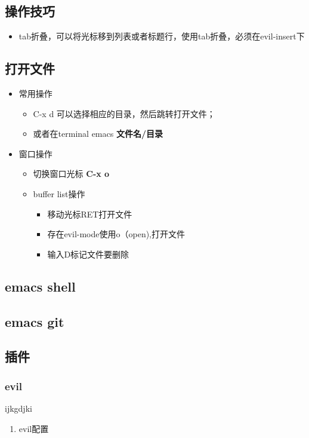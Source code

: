 \documentclass[11pt]{article}
\begin{document}
\subsection{操作技巧}
\label{sec:orgfbd032c}

\begin{itemize}
\item tab折叠，可以将光标移到列表或者标题行，使用tab折叠，必须在evil-insert下
\end{itemize}

\subsection{打开文件}
\label{sec:org768a3b0}
\begin{itemize}
\item 常用操作
\begin{itemize}
\item C-x d 可以选择相应的目录，然后跳转打开文件；
\item 或者在terminal emacs \textbf{\textbf{文件名/目录}}
\end{itemize}
\end{itemize}


\begin{itemize}
\item 窗口操作
\begin{itemize}
\item 切换窗口光标 \textbf{\textbf{C-x o}}
\item buffer list操作
\begin{itemize}
\item 移动光标RET打开文件
\item 存在evil-mode使用o（open),打开文件
\item 输入D标记文件要删除
\end{itemize}
\end{itemize}
\end{itemize}


\subsection{emacs shell}
\label{sec:orgcb785a8}

\subsection{emacs git}
\label{sec:org03d5e42}

\subsection{插件}
\label{sec:org8728498}

\subsubsection{evil}
\label{sec:orga2bd899}

ijkgdjki
\begin{enumerate}
\item evil配置
\label{sec:org1041b40}
\end{enumerate}
\end{document}
